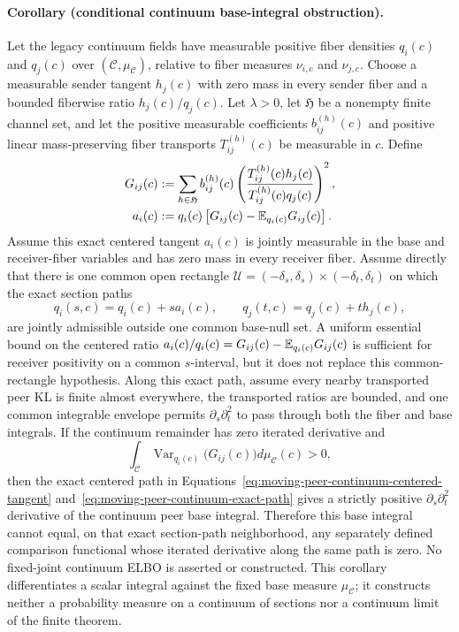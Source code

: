 \paragraph{Corollary (conditional continuum base-integral obstruction).}
Let the legacy continuum fields have measurable positive fiber densities \(q_i(c)\) and \(q_j(c)\) over \((\mathcal C,\mu_{\mathcal C})\), relative to fiber measures \(\nu_{i,c}\) and \(\nu_{j,c}\). Choose a measurable sender tangent \(h_j(c)\) with zero mass in every sender fiber and a bounded fiberwise ratio \(h_j(c)/q_j(c)\). Let \(\lambda>0\), let \(\mathfrak H\) be a nonempty finite channel set, and let the positive measurable coefficients \(b_{ij}^{(h)}(c)\) and positive linear mass-preserving fiber transports \(T_{ij}^{(h)}(c)\) be measurable in \(c\). Define
\begin{align}
G_{ij}(c)
&:=\sum_{h\in\mathfrak H}b_{ij}^{(h)}(c)
\left(
\frac{T_{ij}^{(h)}(c)h_j(c)}
{T_{ij}^{(h)}(c)q_j(c)}
\right)^2,
\label{eq:moving-peer-continuum-aggregate}\\
a_i(c)
&:=q_i(c)\left[
G_{ij}(c)-\mathbb E_{q_i(c)}G_{ij}(c)
\right].
\label{eq:moving-peer-continuum-centered-tangent}
\end{align}
Assume this exact centered tangent \(a_i(c)\) is jointly measurable in the base and receiver-fiber variables and has zero mass in every receiver fiber. Assume directly that there is one common open rectangle \(\mathcal U=(-\delta_s,\delta_s)\times(-\delta_t,\delta_t)\) on which the exact section paths
\begin{equation}
q_i(s,c)=q_i(c)+s a_i(c),
\qquad
q_j(t,c)=q_j(c)+t h_j(c),
\label{eq:moving-peer-continuum-exact-path}
\end{equation}
are jointly admissible outside one common base-null set. A uniform essential bound on the centered ratio \(a_i(c)/q_i(c)=G_{ij}(c)-\mathbb E_{q_i(c)}G_{ij}(c)\) is sufficient for receiver positivity on a common \(s\)-interval, but it does not replace this common-rectangle hypothesis. Along this exact path, assume every nearby transported peer KL is finite almost everywhere, the transported ratios are bounded, and one common integrable envelope permits \(\partial_s\partial_t^2\) to pass through both the fiber and base integrals. If the continuum remainder has zero iterated derivative and
\begin{equation}
\int_{\mathcal C}
\operatorname{Var}_{q_i(c)}\bigl(G_{ij}(c)\bigr)
d\mu_{\mathcal C}(c)>0,
\label{eq:moving-peer-continuum-positive-variance}
\end{equation}
then the exact centered path in Equations~\eqref{eq:moving-peer-continuum-centered-tangent} and~\eqref{eq:moving-peer-continuum-exact-path} gives a strictly positive \(\partial_s\partial_t^2\) derivative of the continuum peer base integral. Therefore this base integral cannot equal, on that exact section-path neighborhood, any separately defined comparison functional whose iterated derivative along the same path is zero. No fixed-joint continuum ELBO is asserted or constructed. This corollary differentiates a scalar integral against the fixed base measure \(\mu_{\mathcal C}\); it constructs neither a probability measure on a continuum of sections nor a continuum limit of the finite theorem.

